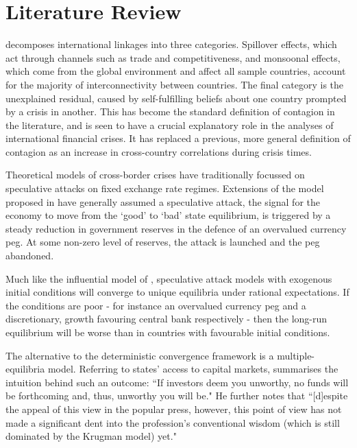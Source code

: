 \documentclass[../base.tex]{subfiles}
\begin{document}
\section{Literature Review}
\label{lit}

\cite{masson1998contagion} decomposes international linkages into three categories. Spillover effects, which act through channels such as trade and competitiveness, and monsoonal effects, which come from the global environment and affect all sample countries, account for the majority of interconnectivity between countries. The final category is the unexplained residual, caused by self-fulfilling beliefs about one country prompted by a crisis in another. This has become the standard definition of contagion in the literature, and is seen to have a crucial explanatory role in the analyses of international financial crises. It has replaced a previous, more general definition of contagion as an increase in cross-country correlations during crisis times.


Theoretical models of cross-border crises have traditionally focussed on speculative attacks on fixed exchange rate regimes. Extensions of the model proposed in \cite{krugman1979model} have generally assumed a speculative attack, the signal for the economy to move from the `good' to `bad' state equilibrium, is triggered by a steady reduction in government reserves in the defence of an overvalued currency peg. At some non-zero level of reserves, the attack is launched and the peg abandoned.

Much like the influential model of \cite{barro1983rules}, speculative attack models with exogenous initial conditions will converge to unique equilibria under rational expectations. If the conditions are poor - for instance an overvalued currency peg and a discretionary, growth favouring central bank respectively - then the long-run equilibrium will be worse than in countries with favourable initial conditions.


The alternative to the deterministic convergence framework is a multiple-equilibria model. Referring to states' access to capital markets, \cite{calvo1995varieties} summarises the intuition behind such an outcome: ``If investors deem you unworthy, no funds will be forthcoming and, thus, unworthy you will be." He further notes that ``[d]espite the appeal of this view in the popular press, however, this point of view has not made a significant dent into the profession's conventional wisdom (which is still dominated by the Krugman model) yet."
\end{document}
